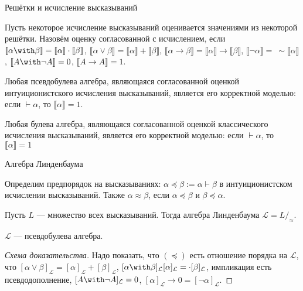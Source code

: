 \documentclass[aspectratio=169]{beamer}
\begin{document}
\begin{frame}{Решётки и исчисление высказываний}
\begin{defrus}Пусть некоторое исчисление высказываний оценивается значениями из некоторой решётки.
Назовём оценку согласованной с исчислением, если 
$\llbracket\alpha\with\beta\rrbracket = \llbracket\alpha\rrbracket\cdot\llbracket\beta\rrbracket$,
$\llbracket\alpha\vee\beta\rrbracket = \llbracket\alpha\rrbracket+\llbracket\beta\rrbracket$,
$\llbracket\alpha\rightarrow\beta\rrbracket = \llbracket\alpha\rrbracket\rightarrow\llbracket\beta\rrbracket$,
$\llbracket\neg\alpha\rrbracket =\ \sim\llbracket\alpha\rrbracket$,
$\llbracket A \with\neg A\rrbracket = 0$, $\llbracket A\rightarrow A \rrbracket = 1$.
\end{defrus}

\begin{thmrus}Любая псевдобулева алгебра, являющаяся согласованной оценкой интуиционистского исчисления высказываний,
является его корректной моделью: если $\vdash\alpha$, то $\llbracket\alpha\rrbracket = 1$.
\end{thmrus}

\begin{thmrus}Любая булева алгебра, являющаяся согласованной оценкой классического исчисления высказываний, 
является его корректной моделью: если $\vdash\alpha$, то $\llbracket\alpha\rrbracket = 1$
\end{thmrus}

\end{frame}

\begin{frame}{Алгебра Линденбаума}
\begin{defrus}Определим предпорядок на высказываниях: $\alpha \preceq \beta := \alpha \vdash \beta$ в интуиционистском исчислении высказываний.
Также $\alpha\approx\beta$, если $\alpha\preceq\beta$ и $\beta\preceq\alpha$.\end{defrus}
\begin{defrus}Пусть $L$ --- множество всех высказываний. Тогда алгебра Линденбаума $\mathcal{L} = L/_\approx$.\end{defrus}
\begin{thmrus}$\mathcal{L}$ --- псевдобулева алгебра.\end{thmrus}
\begin{proof}[Схема доказательства] Надо показать, что $(\preceq)$ есть отношение порядка на $\mathcal{L}$, что
$[\alpha\vee\beta]_\mathcal{L} = [\alpha]_\mathcal{L}+[\beta]_\mathcal{L}$, 
$[\alpha\with\beta]_\mathcal{L}[\alpha]_\mathcal{L} = \cdot[\beta]_\mathcal{L}$, импликация есть псевдодополнение,
$[A\with\neg A]_\mathcal{L} = 0$, $[\alpha]_\mathcal{L}\rightarrow 0 = [\neg\alpha]_\mathcal{L}$.\end{proof}
\end{frame}
\end{document}
